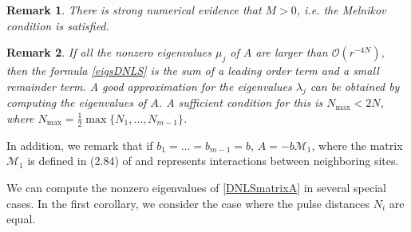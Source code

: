 \documentclass[12pt]{elsarticle}
\newtheorem{remark}{Remark}
\begin{document}
\begin{remark}
There is strong numerical evidence that $M > 0$, i.e. the Melnikov condition is satisfied.
\end{remark}

\begin{remark}
If all the nonzero eigenvalues $\mu_j$ of $A$ are larger than $\mathcal{O}(r^{-4N})$, then the formula \eqref{eigsDNLS} is the sum of a leading order term and a small remainder term. A good approximation for the eigenvalues $\lambda_j$ can be obtained by computing the eigenvalues of $A$. A sufficient condition for this is $N_{\mathrm{max}} < 2 N$, where $N_{\mathrm{max}} = \frac{1}{2} \max\{ N_1, \dots, N_{m-1}\}$.
\end{remark}

\noindent In addition, we remark that if $b_1 = \dots = b_{m-1} = b$, $A = -b \mathcal{M}_1$, where the matrix $\mathcal{M}_1$ is defined in (2.84) of \cite{Kevrekidis2009} and represents interactions between neighboring sites.

We can compute the nonzero eigenvalues of \eqref{DNLSmatrixA} in several special cases. In the first corollary, we consider the case where the pulse distances $N_i$ are equal.
\end{document}
